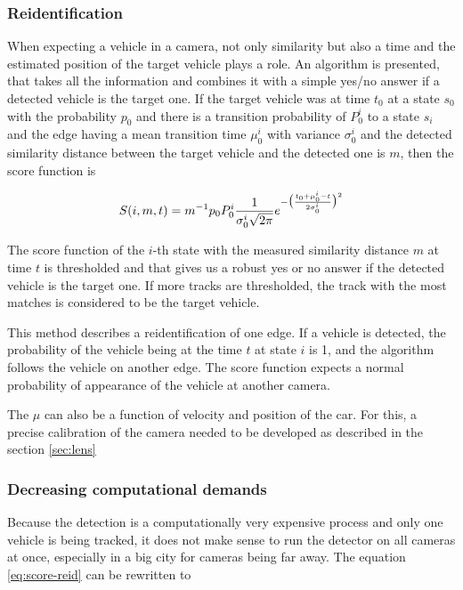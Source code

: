 \documentclass[a4paper,11pt,titlepage,twoside]{article}
\numberwithin{figure}{section}
\begin{document}
\subsubsection{Reidentification}
\label{sec:reidentification}
When expecting a vehicle in a camera, not only similarity but also a time and the estimated position of the target vehicle plays a role. An algorithm is presented, that takes all the information and combines it with a simple yes/no answer if a detected vehicle is the target one. If the target vehicle was at time $t_0$ at a state $s_0$ with the probability $p_0$ and there is a transition probability of $P_0^i$ to a state $s_i$ and the edge having a mean transition time $\mu_0^i$ with variance $\sigma_0^i$ and the detected similarity distance between the target vehicle and the detected one is $m$, then the score function is 

\begin{equation}
\label{eq:score-reid}
S(i, m, t) = m^{-1}p_0 P_0^i \frac{1}{\sigma_0^i \sqrt{2\pi}}e^{-\big{(}\frac{t_0 + \mu_0^i - t}{2\sigma_0^i}\big{)}^2}
\end{equation}

The score function of the $i$-th state with the measured similarity distance $m$ at time $t$ is thresholded and that gives us a robust yes or no answer if the detected vehicle is the target one. If more tracks are thresholded, the track with the most matches is considered to be the target vehicle.

This method describes a reidentification of one edge. If a vehicle is detected, the probability of the vehicle being at the time $t$ at state $i$ is 1, and the algorithm follows the vehicle on another edge. The score function expects a normal probability of appearance of the vehicle at another camera. 

The $\mu$ can also be a function of velocity and position of the car. For this, a precise calibration of the camera needed to be developed as described in the section \ref{sec:lens}

\clearpage
\subsubsection{Decreasing computational demands}
Because the detection is a computationally very expensive process and only one vehicle is being tracked, it does not make sense to run the detector on all cameras at once, especially in a big city for cameras being far away. The equation \ref{eq:score-reid} can be rewritten to
\end{document}
